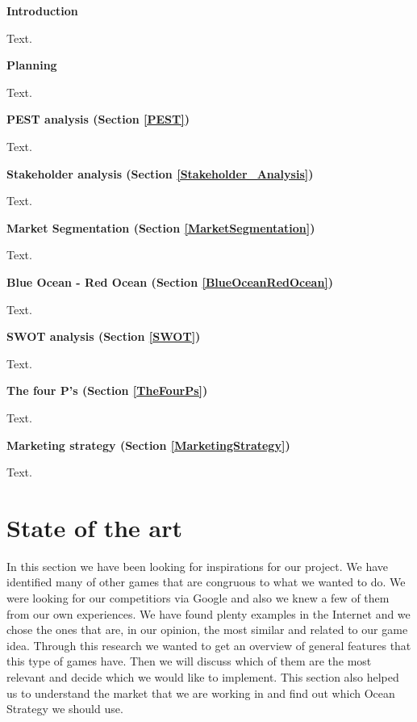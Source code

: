 \documentclass[12p]{article}
\begin{document}
\textbf{Introduction}

Text. \medskip

\textbf{Planning}

Text. \medskip

\textbf{PEST analysis (Section \ref{PEST})}

Text. \medskip

\textbf{Stakeholder analysis (Section \ref{Stakeholder_Analysis})}

Text. \medskip

\textbf{Market Segmentation (Section \ref{MarketSegmentation})}

Text. \medskip

\textbf{Blue Ocean - Red Ocean (Section \ref{BlueOceanRedOcean})}

Text. \medskip

\textbf{SWOT analysis (Section \ref{SWOT})}

Text. \medskip

\textbf{The four P's (Section \ref{TheFourPs})}

Text.  \medskip

\textbf{Marketing strategy (Section \ref{MarketingStrategy})}

Text.


\newpage
\section{State of the art}

In this section we have been looking for inspirations for our project. We have identified many of other games that are congruous to what we wanted to do.
We were looking for our competitiors via Google and also we knew a few of them from our own experiences. We have found plenty examples in the Internet and we chose the ones that are, in our opinion, the most similar and related to our game idea. Through this research we wanted to get an overview of general features that this type of games have. Then we will discuss which of them are the most relevant and decide which we would like to implement. This section also helped us to understand the market that we are working in and find out which Ocean Strategy we should use.

\end{document}
